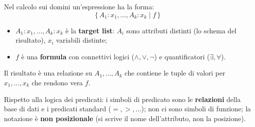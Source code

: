 \documentclass[12pt]{extarticle}
\begin{document}
\medskip
\noindent Nel calcolo sui domini un'espressione ha la forma:
\[
\{\, A_1 : x_1, \dots, A_k : x_k \mid f \,\}
\]
\begin{itemize}
    \item $A_1 : x_1, \dots, A_k : x_k$ è la \textbf{target list}: $A_i$ sono attributi distinti (lo schema del risultato), $x_i$ variabili distinte;
    \item $f$ è una \textbf{formula} con connettivi logici ($\wedge, \vee, \neg$) e quantificatori ($\exists, \forall$).
\end{itemize}
Il risultato è una relazione su $A_1, \dots, A_k$ che contiene le tuple di valori per $x_1, \dots, x_k$ che rendono vera $f$.

\medskip
\noindent Rispetto alla logica dei predicati: i simboli di predicato sono le \textbf{relazioni} della base di dati e i predicati standard ($=, >, \dots$); non ci sono simboli di funzione; la notazione è \textbf{non posizionale} (si scrive il nome dell'attributo, non la posizione).
\end{document}
